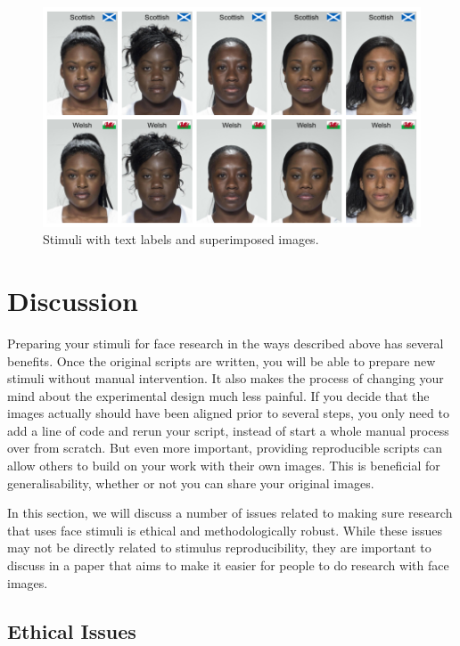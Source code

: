 \documentclass[
  doc,floatsintext]{apa6}
\begin{document}
\begin{figure}
\includegraphics[width=1\linewidth]{index_files/figure-latex/label-comp-1} \caption{Stimuli with text labels and superimposed images.}\label{fig:label-comp}
\end{figure}

\hypertarget{discussion}{%
\section{Discussion}\label{discussion}}

Preparing your stimuli for face research in the ways described above has several benefits. Once the original scripts are written, you will be able to prepare new stimuli without manual intervention. It also makes the process of changing your mind about the experimental design much less painful. If you decide that the images actually should have been aligned prior to several steps, you only need to add a line of code and rerun your script, instead of start a whole manual process over from scratch. But even more important, providing reproducible scripts can allow others to build on your work with their own images. This is beneficial for generalisability, whether or not you can share your original images.

In this section, we will discuss a number of issues related to making sure research that uses face stimuli is ethical and methodologically robust. While these issues may not be directly related to stimulus reproducibility, they are important to discuss in a paper that aims to make it easier for people to do research with face images.

\hypertarget{ethical-issues}{%
\subsection{Ethical Issues}\label{ethical-issues}}
\end{document}
